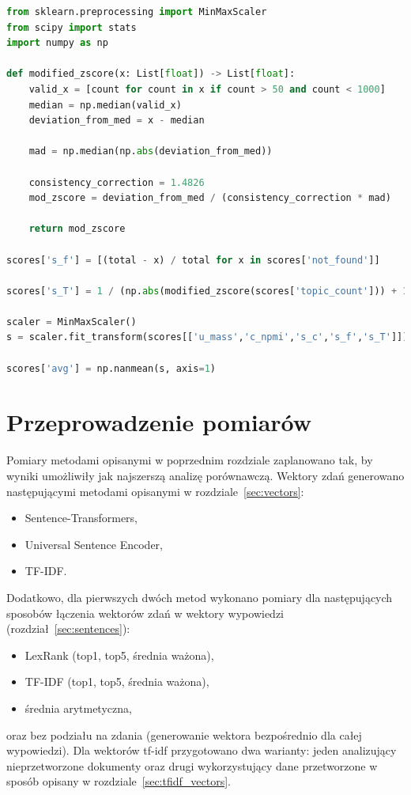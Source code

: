 		\begin{lstlisting}[label=lst:final_score,language=Python,caption=Obliczanie finalnej oceny spójności tematów dla listy modeli]
from sklearn.preprocessing import MinMaxScaler
from scipy import stats
import numpy as np

def modified_zscore(x: List[float]) -> List[float]:
	valid_x = [count for count in x if count > 50 and count < 1000]
	median = np.median(valid_x)
	deviation_from_med = x - median

	mad = np.median(np.abs(deviation_from_med))

	consistency_correction = 1.4826
	mod_zscore = deviation_from_med / (consistency_correction * mad)

	return mod_zscore

scores['s_f'] = [(total - x) / total for x in scores['not_found']]

scores['s_T'] = 1 / (np.abs(modified_zscore(scores['topic_count'])) + 1)

scaler = MinMaxScaler()
s = scaler.fit_transform(scores[['u_mass','c_npmi','s_c','s_f','s_T']])

scores['avg'] = np.nanmean(s, axis=1)
		\end{lstlisting}

\section{Przeprowadzenie pomiarów}
	Pomiary metodami opisanymi w poprzednim rozdziale zaplanowano tak, by wyniki umożliwiły jak najszerszą analizę porównawczą.
	Wektory zdań generowano następującymi metodami opisanymi w rozdziale~\ref{sec:vectors}:
	\begin{itemize}
		\item Sentence-Transformers,
		\item Universal Sentence Encoder,
		\item TF-IDF\@.
	\end{itemize}
	Dodatkowo, dla pierwszych dwóch metod wykonano pomiary dla następujących sposobów łączenia wektorów zdań w wektory wypowiedzi (rozdział~\ref{sec:sentences}):
	\begin{itemize}
		\item LexRank (top1, top5, średnia ważona),
		\item TF-IDF (top1, top5, średnia ważona),
		\item średnia arytmetyczna,
	\end{itemize}
	oraz bez podziału na zdania (generowanie wektora bezpośrednio dla całej wypowiedzi).
	Dla wektorów tf-idf przygotowano dwa warianty: jeden analizujący nieprzetworzone dokumenty
		oraz drugi wykorzystujący dane przetworzone w sposób opisany w rozdziale~\ref{sec:tfidf_vectors}.

